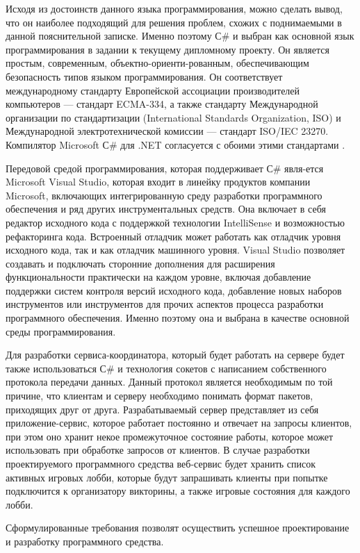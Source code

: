 Исходя из достоинств данного языка программирования, можно сделать вывод, что он наиболее подходящий для решения проблем,
схожих с поднимаемыми в данной пояснительной записке. Именно поэтому С\# и выбран как основной язык программирования в задании к текущему дипломному проекту.
Он является простым, современным, объектно-ориенти-рованным, обеспечивающим безопасность типов языком программирования. Он соответствует международному стандарту Европейской ассоциации производителей компьютеров — стандарт ECMA-334, а
также стандарту Международной организации по стандартизации (International
Standards Organization, ISO) и Международной электротехнической комиссии
— стандарт ISO/IEC 23270. Компилятор Microsoft С\# для .NET согласуется с обоими этими стандартами \cite{msdn_charp}.

Передовой средой программирования, которая поддерживает С\# явля-ется Microsoft Visual Studio, которая входит в линейку
продуктов компании Microsoft, включающих интегрированную среду разработки программного обеспечения и ряд других инструментальных средств. Она
включает в себя редактор исходного кода с поддержкой технологии IntelliSense
и возможностью рефакторинга кода. Встроенный отладчик может работать как
отладчик уровня исходного кода, так и как отладчик машинного уровня. Visual
Studio позволяет создавать и подключать сторонние дополнения для расширения функциональности практически на каждом уровне, включая добавление
поддержки систем контроля версий исходного кода, добавление новых наборов инструментов или инструментов для прочих аспектов процесса разработки
программного обеспечения. Именно поэтому она и выбрана в качестве основной среды программирования.

Для разработки сервиса-координатора, который будет работать на сервере будет также использоваться С\# и технология сокетов с написанием собственного протокола передачи данных.
Данный протокол является необходимым по той причине, что клиентам и серверу необходимо понимать формат пакетов, приходящих друг от друга. Разрабатываемый сервер представляет из себя
приложение-сервис, которое работает постоянно и отвечает на запросы клиентов, при этом оно хранит некое промежуточное состояние работы, которое может использовать
при обработке запросов от клиентов. В случае разработки проектируемого программного средства веб-сервис будет хранить список активных игровых лобби, которые будут запрашивать
клиенты при попытке подключится к организатору викторины, а также игровые состояния для каждого лобби.

Сформулированные требования позволят осуществить успешное проектирование и разработку программного средства.
